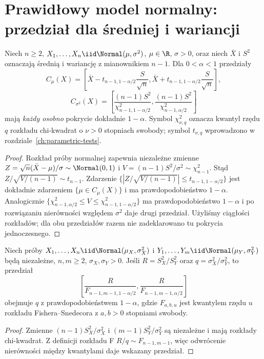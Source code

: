 \section{Prawidłowy model normalny: przedział dla średniej i wariancji}
\begin{twierdzenie}
\label{thm:normal-mean-var-ci}
Niech $n\ge2$, $X_1,\ldots,X_n\iid\Normal(\mu,\sigma^2)$,
$\mu\in\R$, $\sigma>0$, oraz niech $\bar X$ i $S^2$ oznaczają
średnią i wariancję z mianownikiem $n-1$. Dla $0<\alpha<1$
przedziały
\[
 C_\mu(X)=\left[\bar X-t_{n-1,1-\alpha/2}\frac{S}{\sqrt n},
 \bar X+t_{n-1,1-\alpha/2}\frac{S}{\sqrt n}\right],
\]
\[
 C_{\sigma^2}(X)=\left[
 \frac{(n-1)S^2}{\chi^2_{n-1,1-\alpha/2}},
 \frac{(n-1)S^2}{\chi^2_{n-1,\alpha/2}}\right]
\]
mają \emph{każdy osobno} pokrycie dokładnie $1-\alpha$.
Symbol $\chi^2_{\nu,q}$ oznacza kwantyl rzędu $q$ rozkładu
chi-kwadrat o $\nu>0$ stopniach swobody; symbol
$t_{\nu,q}$ wprowadzono w rozdziale~\ref{ch:parametric-tests}.
\end{twierdzenie}
\begin{proof}
Rozkład próby normalnej zapewnia niezależne zmienne
$Z=\sqrt n(\bar X-\mu)/\sigma\sim\Normal(0,1)$ i
$V=(n-1)S^2/\sigma^2\sim\chi^2_{n-1}$. Stąd
$Z/\sqrt{V/(n-1)}\sim t_{n-1}$. Zdarzenie
$\{|Z/\sqrt{V/(n-1)}|\le t_{n-1,1-\alpha/2}\}$ jest
dokładnie zdarzeniem $\{\mu\in C_\mu(X)\}$ i ma
prawdopodobieństwo $1-\alpha$. Analogicznie
$\{\chi^2_{n-1,\alpha/2}\le V\le
\chi^2_{n-1,1-\alpha/2}\}$ ma prawdopodobieństwo
$1-\alpha$ i po rozwiązaniu nierówności względem
$\sigma^2$ daje drugi przedział. Użyliśmy ciągłości
rozkładów; dla obu przedziałów razem nie zadeklarowano
tu pokrycia jednoczesnego.
\end{proof}

\begin{stwierdzenie}
\label{prop:ratio-var-ci}
Niech próby $X_1,\ldots,X_n\iid\Normal(\mu_X,\sigma_X^2)$
i $Y_1,\ldots,Y_m\iid\Normal(\mu_Y,\sigma_Y^2)$ będą
niezależne, $n,m\ge2$, $\sigma_X,\sigma_Y>0$.
Jeśli $R=S_X^2/S_Y^2$ oraz $q=\sigma_X^2/\sigma_Y^2$,
to przedział
\[
 \left[\frac{R}{F_{n-1,m-1,1-\alpha/2}},
       \frac{R}{F_{n-1,m-1,\alpha/2}}\right]
\]
obejmuje $q$ z prawdopodobieństwem $1-\alpha$,
gdzie $F_{a,b,u}$ jest kwantylem rzędu $u$
rozkładu Fishera--Snedecora z $a,b>0$ stopniami swobody.
\end{stwierdzenie}
\begin{proof}
Zmienne
$(n-1)S_X^2/\sigma_X^2$ i
$(m-1)S_Y^2/\sigma_Y^2$ są niezależne i mają
rozkłady chi-kwadrat. Z definicji rozkładu F
$R/q\sim F_{n-1,m-1}$, więc odwrócenie nierówności
między kwantylami daje wskazany przedział.
\end{proof}

